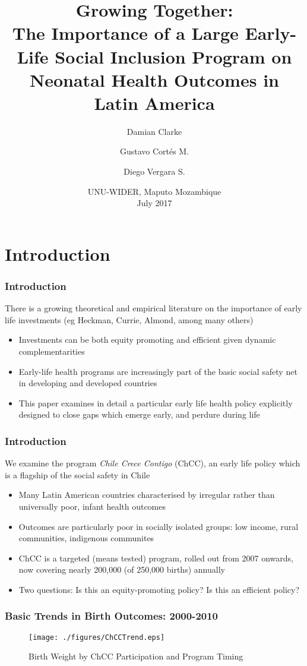 \documentclass[10pt,letterpaper,subeqn]{beamer}
\title{\textbf{Growing Together}: \\ \vspace{3mm}
  \small{The Importance of a Large Early-Life Social Inclusion
    Program on Neonatal Health Outcomes in Latin America}}
\author{Damian Clarke\inst{\ddag}  
   \and Gustavo Cort\'es M.\inst{\ddag}  
   \and Diego Vergara S.\inst{\ddag}}
\institute{\inst{\ddag}Universidad de Santiago de Chile \\ \vspace{5mm}}
\date{UNU-WIDER, Maputo Mozambique \\ \vspace{2mm} July 2017}
\begin{document}
\begin{frame}
\titlepage
\end{frame}

\section{Introduction}
\begin{frame}
\frametitle{Introduction}
There is a growing theoretical and empirical literature on the importance of early
life investments (eg Heckman, Currie, Almond, among many others) \\ \vspace{3mm}
\begin{itemize}
\item Investments can be both equity promoting and efficient given dynamic complementarities
\item Early-life health programs are increasingly part of the basic social safety net in
  developing and developed countries
\item This paper examines in detail a particular early life health policy explicitly
  designed to close gaps which emerge early, and perdure during life
\end{itemize}
\end{frame}

\begin{frame}
\frametitle{Introduction}
We examine the program \emph{Chile Crece Contigo} (ChCC), an early life policy which is
a flagship of the social safety in Chile \vspace{3mm}
\begin{itemize}
\item Many Latin American countries characterised by irregular rather than universally poor,
  infant health outcomes
\item Outcomes are particularly poor in socially isolated groups: low income, rural
  communities, indigenous communites
\item ChCC is a targeted (means tested) program, rolled out from 2007 onwards, now
  covering nearly 200,000 (of 250,000 births) annually
\item Two questions: Is this an equity-promoting policy?  Is this an efficient policy?
\end{itemize}
\end{frame}

\begin{frame}[label=Trends]
\frametitle{Basic Trends in Birth Outcomes: 2000-2010}
\begin{figure}[htpb!]
  \begin{center}
  \centering
  \caption{Birth Weight by ChCC Participation and Program Timing}
  \texttt{[image: ./figures/ChCCTrend.eps]}
  \label{fig:ChCCtrends}
\end{center}
\end{figure}
\vspace{-5mm}
\footnotesize{\hyperlink{longTrends}{}}
\end{frame}
\end{document}
